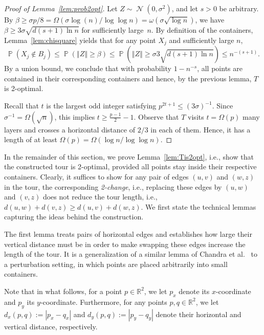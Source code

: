 \documentclass[11pt,DIV=12,a4paper]{scrartcl}
\newcommand{\real}{\ensuremath{\mathbb{R}}}
\DeclareMathOperator{\probab}{\mathbb{P}}
\newcommand{\norm}[1]{\left\Vert #1 \right\Vert}
\DeclareMathOperator{\Gauss}{\mathcal{N}}
\begin{document}
\begin{proof}[Proof of Lemma~\ref{lem:prob2opt}]
Let $Z \sim \Gauss(0,\sigma^2)$, and let $s>0$ be arbitrary. By $\beta \ge \sigma p/8 = \Omega(\sigma \log(n)/\log\log n) = \omega(\sigma\sqrt{\log n})$, we have $\beta \ge 3\sigma\sqrt{d(s+1)\ln n}$ for sufficiently large~$n$. By definition of the containers, Lemma~\ref{lem:chisquare} yields that for any point $X_j$ and sufficiently large $n$,
\[ \probab(X_j \notin B_j) \le \probab(\norm{Z}\ge \beta) \le \probab(\norm{Z} \ge \sigma 3\sqrt{d (s+1) \ln n}) \le n^{-(s+1)}. \]
By a union bound, we conclude that with probability $1-n^{-s}$, all points are contained in their corresponding containers and hence, by the previous lemma, $T$ is 2-optimal.

Recall that $t$ is the largest odd integer satisfying $p^{2t+1} \le (3\sigma)^{-1}$. Since $\sigma^{-1} = \Omega(\sqrt{n})$, this implies $t \ge \frac{p-1}{2}-1$. Observe that $T$ visits $t = \Omega(p)$ many layers and crosses a horizontal distance of $2/3$ in each of them. Hence, it has a length of at least $\Omega(p) = \Omega(\log n/\log \log n)$.
\end{proof}


In the remainder of this section, we prove Lemma~\ref{lem:Tis2opt}, i.e., show that the constructed tour is 2-optimal, provided all points stay inside their respective containers. Clearly, it suffices to show for any pair of edges $(u,v)$ and $(w,z)$ in the tour, the corresponding \emph{2-change}, i.e., replacing these edges by $(u,w)$ and $(v,z)$ does not reduce the tour length, i.e., $d(u,w)+d(v,z) \ge d(u,v)+d(w,z)$.  We first state the technical lemmas capturing the ideas behind the construction.

The first lemma treats pairs of horizontal edges and establishes how large their vertical distance must be in order to make swapping these edges increase the length of the tour. It is a generalization of a similar lemma of Chandra et al.~\cite{ChandraEA:OldOpt:1999} to a perturbation setting, in which points are placed arbitrarily into small containers.

Note that in what follows, for a point $p\in \real^2$, we let $p_x$ denote its $x$-coordinate and $p_y$ its $y$-coordinate. Furthermore, for any points $p,q\in \real^2$, we let $d_x(p,q):=|p_x-q_x|$ and $d_y(p,q):=|p_y-q_y|$ denote their horizontal and vertical distance, respectively.
\end{document}
